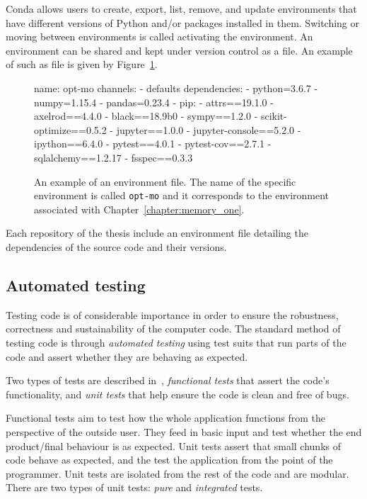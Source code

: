 Conda allows users to create, export, list, remove, and update environments that
have different versions of Python and/or packages installed in them. Switching
or moving between environments is called activating the environment. An environment
can be shared and kept under version control as a file. An example of
such as file is given by Figure~\ref{fig:environment_file}.

\begin{figure}
\begin{shell}
name: opt-mo
channels:
  - defaults
dependencies:
  - python=3.6.7
  - numpy=1.15.4
  - pandas=0.23.4
  - pip:
    - attrs==19.1.0
    - axelrod==4.4.0
    - black==18.9b0
    - sympy==1.2.0
    - scikit-optimize==0.5.2
    - jupyter==1.0.0
    - jupyter-console==5.2.0
    - ipython==6.4.0
    - pytest==4.0.1
    - pytest-cov==2.7.1
    - sqlalchemy==1.2.17
    - fsspec==0.3.3
\end{shell}
\caption{An example of an environment file. The name of the specific environment is called
\texttt{opt-mo} and it corresponds to the environment associated with
Chapter~\ref{chapter:memory_one}.}\label{fig:environment_file}
\end{figure}

Each repository of the thesis include an environment file detailing the dependencies
of the source code and their versions.

\subsection{Automated testing}

Testing code is of considerable importance in order to ensure the robustness,
correctness and sustainability of the computer code. The standard method of testing code is through
\textit{automated testing} using test suits that run parts of the code and
assert whether they are behaving as expected.

Two types of tests are described in~\cite{Percival2014}, \textit{functional
tests} that assert the code's functionality, and \textit{unit tests} that help
ensure the code is clean and free of bugs.

Functional tests aim to test how the whole application functions from the
perspective of the outside user. They feed in basic input and test whether the
end product/final behaviour is as expected. Unit tests assert that small chunks
of code behave as expected, and the test the application from the point of the
programmer. Unit tests are isolated from the rest of the code and are modular.
There are two types of unit tests: \textit{pure} and \textit{integrated} tests.

